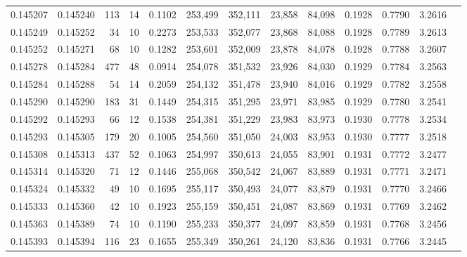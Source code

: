 \begin{tabular}{rrrrrrrrrrrrr}
0.145207 & 0.145240 &   113 &  14 &                                     0.1102 & 253,499 & 352,111 &  23,858 &  84,098 & 0.1928 & 0.7790 & 3.2616 \\
0.145249 & 0.145252 &    34 &  10 &                                     0.2273 & 253,533 & 352,077 &  23,868 &  84,088 & 0.1928 & 0.7789 & 3.2613 \\
0.145252 & 0.145271 &    68 &  10 &                                     0.1282 & 253,601 & 352,009 &  23,878 &  84,078 & 0.1928 & 0.7788 & 3.2607 \\
0.145278 & 0.145284 &   477 &  48 &                                     0.0914 & 254,078 & 351,532 &  23,926 &  84,030 & 0.1929 & 0.7784 & 3.2563 \\
0.145284 & 0.145288 &    54 &  14 &                                     0.2059 & 254,132 & 351,478 &  23,940 &  84,016 & 0.1929 & 0.7782 & 3.2558 \\
0.145290 & 0.145290 &   183 &  31 &                                     0.1449 & 254,315 & 351,295 &  23,971 &  83,985 & 0.1929 & 0.7780 & 3.2541 \\
0.145292 & 0.145293 &    66 &  12 &                                     0.1538 & 254,381 & 351,229 &  23,983 &  83,973 & 0.1930 & 0.7778 & 3.2534 \\
0.145293 & 0.145305 &   179 &  20 &                                     0.1005 & 254,560 & 351,050 &  24,003 &  83,953 & 0.1930 & 0.7777 & 3.2518 \\
0.145308 & 0.145313 &   437 &  52 &                                     0.1063 & 254,997 & 350,613 &  24,055 &  83,901 & 0.1931 & 0.7772 & 3.2477 \\
0.145314 & 0.145320 &    71 &  12 &                                     0.1446 & 255,068 & 350,542 &  24,067 &  83,889 & 0.1931 & 0.7771 & 3.2471 \\
0.145324 & 0.145332 &    49 &  10 &                                     0.1695 & 255,117 & 350,493 &  24,077 &  83,879 & 0.1931 & 0.7770 & 3.2466 \\
0.145333 & 0.145360 &    42 &  10 &                                     0.1923 & 255,159 & 350,451 &  24,087 &  83,869 & 0.1931 & 0.7769 & 3.2462 \\
0.145363 & 0.145389 &    74 &  10 &                                     0.1190 & 255,233 & 350,377 &  24,097 &  83,859 & 0.1931 & 0.7768 & 3.2456 \\
0.145393 & 0.145394 &   116 &  23 &                                     0.1655 & 255,349 & 350,261 &  24,120 &  83,836 & 0.1931 & 0.7766 & 3.2445 \\

\end{tabular}
